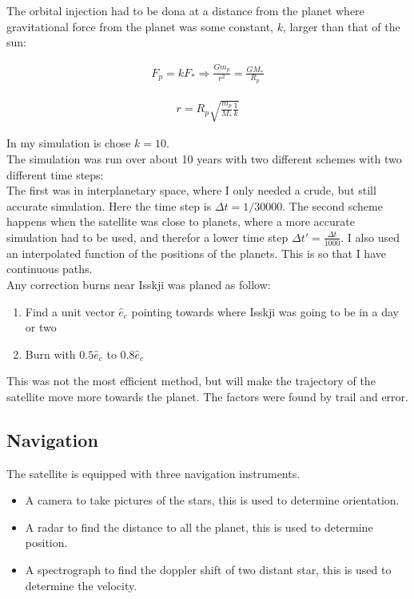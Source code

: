 \documentclass[a4paper, 10pt]{article}
\begin{document}
The orbital injection had to be dona at a distance from the planet where gravitational force from the planet was some constant, $k$, larger than that of the sun:

\begin{align}
F_p = kF_* \Rightarrow \frac{Gm_p}{r^2} = \frac{GM_*}{R_p}
\end{align}


\begin{align}\label{eq:safeDist}
r = R_p\sqrt{\frac{m_p}{M_*}\frac{1}{k}}
\end{align}

In my simulation is chose $k = 10$. \\

The simulation was run over about 10 years with two different schemes with two different time steps:\\
The first was in interplanetary space, where I only needed a crude, but still accurate simulation. Here the time step is $\Delta t = 1/30000$. The second scheme happens when the satellite was close to planets, where a more accurate simulation had to be used, and therefor a lower time step $\Delta t' =\frac{\Delta t}{1000}$. I also used an interpolated function of the positions of the planets. This is so that I have continuous paths.\\

Any correction burns near Isskji was planed as follow:

\begin{enumerate}
\item Find a unit vector $\hat{e}_{c}$ pointing towards where Isskji was going to be in a day or two
\item Burn with $0.5\hat{e}_{c} $ to $ 0.8\hat{e}_{c}$
\end{enumerate}

This was not the most efficient method, but will make the trajectory of the satellite move more towards the planet. The factors were found by trail and error. 


\subsection{Navigation}
The satellite is equipped with three navigation instruments.

\begin{itemize}
\item A camera to take pictures of the stars, this is used to determine orientation.
\item A radar to find the distance to all the planet, this is used to determine position.
\item A spectrograph to find the doppler shift of two distant star, this is used to determine the velocity. 
\end{itemize}
\end{document}
